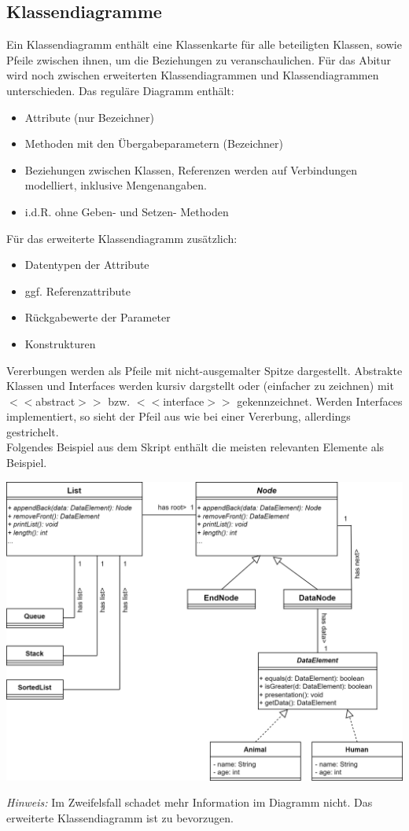 \documentclass{article}
\begin{document}
\subsection{Klassendiagramme}

Ein Klassendiagramm enthält eine Klassenkarte für alle beteiligten Klassen, sowie Pfeile zwischen ihnen, um die Beziehungen zu veranschaulichen. Für das Abitur wird noch zwischen erweiterten Klassendiagrammen und  Klassendiagrammen unterschieden. Das reguläre Diagramm enthält:
\begin{itemize}
    \item Attribute (nur Bezeichner)
    \item Methoden mit den Übergabeparametern (Bezeichner)
    \item Beziehungen zwischen Klassen, Referenzen werden auf Verbindungen modelliert, inklusive Mengenangaben.
    \item i.d.R. ohne Geben- und Setzen- Methoden
\end{itemize}
Für das erweiterte Klassendiagramm zusätzlich:
\begin{itemize}
    \item Datentypen der Attribute
    \item ggf. Referenzattribute 
    \item Rückgabewerte der Parameter 
    \item Konstrukturen
\end{itemize}
Vererbungen werden als Pfeile mit nicht-ausgemalter Spitze dargestellt. Abstrakte Klassen und Interfaces werden kursiv dargstellt oder (einfacher zu zeichnen) mit $<<$abstract$>>$ bzw. $<<$interface$>>$ gekennzeichnet. Werden Interfaces implementiert, so sieht der Pfeil aus wie bei einer Vererbung, allerdings gestrichelt. \\
Folgendes Beispiel aus dem Skript enthält die meisten relevanten Elemente als Beispiel.
\begin{center}
    \includegraphics[scale=0.2]{../../media/adapter_lists.png}
\end{center}
\textit{Hinweis:} Im Zweifelsfall schadet mehr Information im Diagramm nicht. Das erweiterte Klassendiagramm ist zu bevorzugen. 
\end{document}
